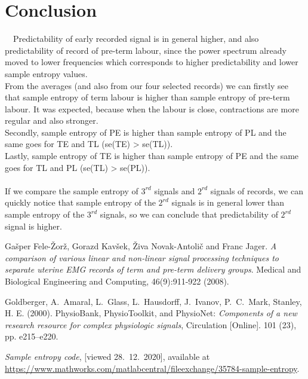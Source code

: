 \documentclass[a4paper,11pt]{article}
\begin{document}
\section{Conclusion}
\ \
Predictability of early recorded signal is in general higher, and also predictability of record of pre-term labour, since the power spectrum already moved to lower frequencies which corresponds to higher predictability and lower sample entropy values.
\\
From the averages (and also from our four selected records) we can firstly see that sample entropy of term labour is higher than sample entropy of pre-term labour. 
It was expected, because when the labour is close, contractions are more regular and also stronger.
\\
Secondly, sample entropy of PE is higher than sample entropy of PL and the same goes for TE and TL (se(TE) > se(TL)).
\\
Lastly, sample entropy of TE is higher than sample entropy of PE and the same goes for TL and PL (se(TL) > se(PL)).
\\
\\
If we compare the sample entropy of $3^{rd}$ signals and $2^{rd}$ signals of records, we can quickly notice that sample entropy of the $2^{rd}$ signals is in general lower than sample entropy of the $3^{rd}$ signals,
so we can conclude that predictability of $2^{rd}$ signal is higher.


\begin{thebibliography}{99}

    Gašper Fele-Žorž, Gorazd Kavšek, Živa Novak-Antolič and Franc Jager. \emph{A comparison of various linear and non-linear signal processing techniques to separate uterine EMG records of term and pre-term delivery groups}. Medical and Biological Engineering and Computing, 46(9):911-922 (2008).

    Goldberger, A.~Amaral, L.~Glass, L.~Hausdorff, J.~Ivanov, P.~C.~Mark, Stanley, H. E. (2000). PhysioBank, PhysioToolkit, and PhysioNet: \emph{Components of a new research resource for complex physiologic signals}, Circulation [Online]. 101 (23), pp. e215–e220.

    \emph{Sample entropy code}, [viewed 28.~12.~2020], available at \url{https://www.mathworks.com/matlabcentral/fileexchange/35784-sample-entropy}.

\end{thebibliography}
\end{document}
